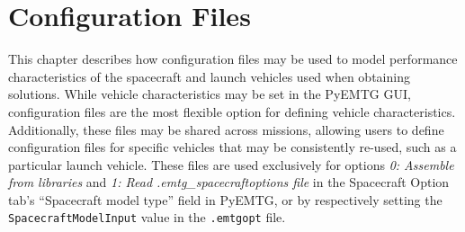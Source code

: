 \chapter{Configuration Files}
\label{chap:config_files}
This chapter describes how configuration files may be used to model performance characteristics of the spacecraft and launch vehicles used when obtaining solutions.
While vehicle characteristics may be set in the PyEMTG \ac{GUI}, configuration files are the most flexible option for defining vehicle characteristics.
Additionally, these files may be shared across missions, allowing users to define configuration files for specific vehicles that may be consistently re-used, such as a particular launch vehicle.
These files are used exclusively for options {\it 0: Assemble from libraries} and {\it 1: Read .emtg\_spacecraftoptions file} in the Spacecraft Option tab's ``Spacecraft model type'' field in PyEMTG, or by respectively setting the {\tt SpacecraftModelInput} value in the {\tt .emtgopt} file. 